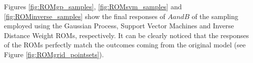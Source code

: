Figures \ref{fig:ROMgp_samples}, \ref{fig:ROMsvm_samples} and \ref{fig:ROMinverse_samples}  show the final responses  of $A and B$ of the sampling employed using the Gaussian Process, Support Vector Machines and Inverse Distance Weight ROMs, respectively. 
It can be clearly noticed that the responses of the ROMs perfectly match the outcomes coming from the original model (see Figure   \ref{fig:ROMgrid_pointsets}).








